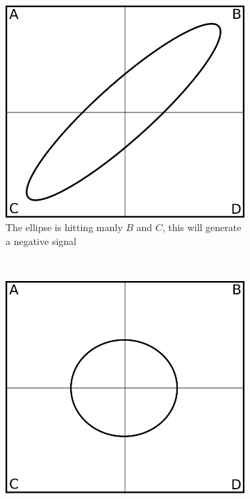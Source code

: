 \documentclass[a4paper,10pt]{article}
\begin{document}
\begin{figure}[H]
  \centering{}
  \begin{subfigure}[t]{0.3 \textwidth}
    \centering
    \includegraphics[width = \textwidth]{ellipse1}
    \caption{The ellipse is hitting manly $B$ and $C$, this will generate a negative signal}
  \end{subfigure}
  ~
  \begin{subfigure}[t]{0.3\textwidth}
    \centering
    \includegraphics[width = \textwidth]{ellipse3}

\end{subfigure}
\end{figure}
\end{document}
